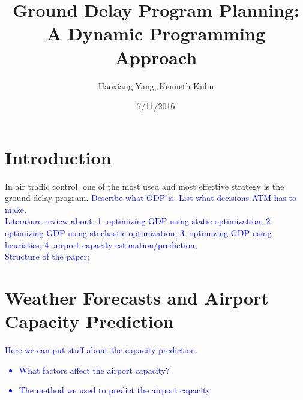 \documentclass[12pt]{article}
\title{Ground Delay Program Planning: A Dynamic Programming Approach}
\author{Haoxiang Yang, Kenneth Kuhn}
\date{7/11/2016}
\begin{document}
\maketitle

\section{Introduction}
	In air traffic control, one of the most used and most effective strategy is the ground delay program. \textcolor{blue}{Describe what GDP is. List what decisions ATM has to make.\\
	\newline Literature review about: 1. optimizing GDP using static optimization; 2. optimizing GDP using stochastic optimization; 3. optimizing GDP using heuristics; 4. airport capacity estimation/prediction;\\
	\newline Structure of the paper;}
\section{Weather Forecasts and Airport Capacity Prediction}\label{Prediction}
	\textcolor{blue}{Here we can put stuff about the capacity prediction.
	\begin{itemize}
		\item What factors affect the airport capacity?
		\item The method we used to predict the airport capacity
	\end{itemize}
	}
\end{document}
